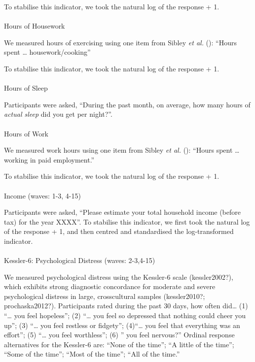 \documentclass[
  single column]{article}
\makeatletter
\let\oldparagraph\paragraph
\renewcommand{\paragraph}{
    \@ifstar
      \xxxParagraphStar
      \xxxParagraphNoStar
  }
\newcommand{\xxxParagraphStar}[1]{\oldparagraph*{#1}\mbox{}}
\newcommand{\xxxParagraphNoStar}[1]{\oldparagraph{#1}\mbox{}}
\makeatother
\begin{document}
To stabilise this indicator, we took the natural log of the response +
1.

\paragraph{Hours of Housework}\label{hours-of-housework-1}

We measured hours of exercising using one item from Sibley \emph{et al.}
(): ``Hours spent \ldots{}
housework/cooking''

To stabilise this indicator, we took the natural log of the response +
1.

\paragraph{Hours of Sleep}\label{hours-of-sleep}

Participants were asked, ``During the past month, on average, how many
hours of \emph{actual sleep} did you get per night?''.

\paragraph{Hours of Work}\label{hours-of-work}

We measured work hours using one item from Sibley \emph{et al.}
(): ``Hours spent \ldots{} working in
paid employment.''

To stabilise this indicator, we took the natural log of the response +
1.

\paragraph{Income (waves: 1-3, 4-15)}\label{income-waves-1-3-4-15}

Participants were asked, ``Please estimate your total household income
(before tax) for the year XXXX''. To stabilise this indicator, we first
took the natural log of the response + 1, and then centred and
standardised the log-transformed indicator.

\paragraph{Kessler-6: Psychological Distress (waves:
2-3,4-15)}\label{kessler-6-psychological-distress-waves-2-34-15}

We measured psychological distress using the Kessler-6 scale
(kessler2002?), which exhibits strong diagnostic concordance for
moderate and severe psychological distress in large, crosscultural
samples (kessler2010?; prochaska2012?). Participants rated during the
past 30 days, how often did\ldots{} (1) ``\ldots{} you feel hopeless'';
(2) ``\ldots{} you feel so depressed that nothing could cheer you up'';
(3) ``\ldots{} you feel restless or fidgety''; (4)``\ldots{} you feel
that everything was an effort''; (5) ``\ldots{} you feel worthless'';
(6) '' you feel nervous?'' Ordinal response alternatives for the
Kessler-6 are: ``None of the time''; ``A little of the time''; ``Some of
the time''; ``Most of the time''; ``All of the time.''
\end{document}
